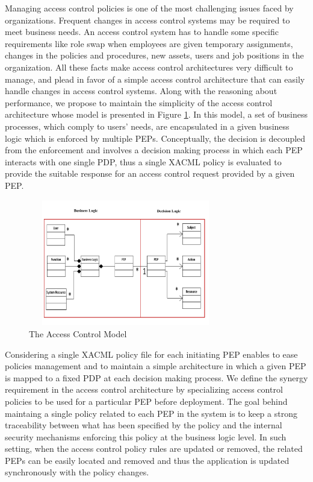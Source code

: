 Managing access control policies is one of the most challenging issues faced by organizations. 
Frequent changes in access control systems may be required to meet business needs. An access control system has to handle some specific 
requirements like role swap when employees are given temporary assignments, changes in the policies and procedures, 
new assets, users and job positions in the organization.
All these facts make access control architectures very difficult to manage, and plead in favor of a 
simple access control architecture that can easily handle changes in access control systems. 
Along with the reasoning about performance, we propose to maintain the simplicity of the access control architecture whose model 
is presented in Figure \ref{model}. In this model, a set of business processes, which comply to users' needs, are encapsulated in a given business logic 
which is enforced by multiple PEPs. Conceptually, the decision is decoupled from the enforcement and involves a decision making process in which each PEP 
interacts 
with one single PDP, thus a single XACML policy is evaluated to provide the suitable response for an access control request provided by a given PEP. 
\begin{figure}[!h]
\begin{center}
\includegraphics[height=5.5cm,width=8.5cm]{model}
\caption{The Access Control Model}
\label{model}
\end{center}
\end{figure}

Considering a single XACML policy file for each initiating PEP enables to ease policies management and to maintain a simple architecture 
in which a given PEP is mapped to a fixed PDP at each decision making process. We define the synergy requirement in the access control 
architecture by specializing access control policies to be used for a particular PEP before deployment. The goal behind maintaing a single 
policy related to each PEP in the system is to keep a strong traceability between what has been specified by the policy and the internal 
security mechanisms enforcing this policy at the business logic level. In such setting, when the access control policy rules are updated or removed, 
the related PEPs can be easily located and removed and thus the application is updated synchronously with the policy changes. 

